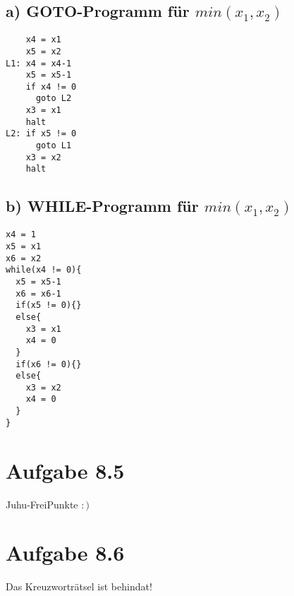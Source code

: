 \documentclass{article}
\begin{document}
\subsection*{a) GOTO-Programm für $min(x_1,x_2)$}
\begin{verbatim}
    x4 = x1
    x5 = x2
L1: x4 = x4-1
    x5 = x5-1
    if x4 != 0
      goto L2
    x3 = x1
    halt
L2: if x5 != 0
      goto L1
    x3 = x2
    halt
\end{verbatim}
\subsection*{b) WHILE-Programm für $min(x_1,x_2)$}
\begin{verbatim}
x4 = 1
x5 = x1
x6 = x2
while(x4 != 0){
  x5 = x5-1
  x6 = x6-1
  if(x5 != 0){}
  else{
    x3 = x1
    x4 = 0
  }
  if(x6 != 0){}
  else{
    x3 = x2
    x4 = 0
  }
}
\end{verbatim}
\section*{Aufgabe 8.5}
Juhu-FreiPunkte $:)$
\section*{Aufgabe 8.6}
Das Kreuzworträtsel ist behindat!
\end{document}
